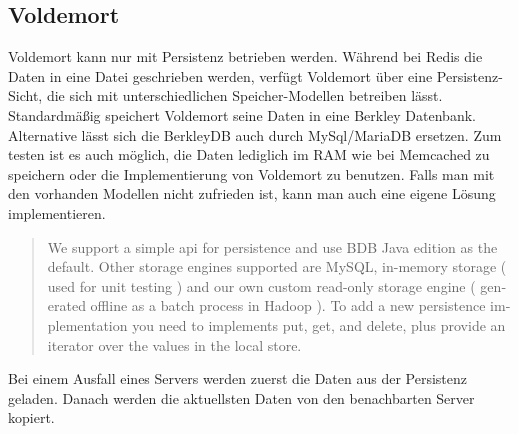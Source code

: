 \subsection{Voldemort}
Voldemort kann nur mit Persistenz betrieben werden. Während bei Redis die Daten
in eine Datei geschrieben werden, verfügt Voldemort über eine Persistenz-Sicht,
die sich mit unterschiedlichen Speicher-Modellen betreiben lässt. Standardmäßig
speichert Voldemort seine Daten in eine Berkley Datenbank. Alternative lässt
sich die BerkleyDB auch durch MySql/MariaDB ersetzen. Zum testen ist es auch
möglich, die Daten lediglich im \gls{RAM} wie bei Memcached zu speichern oder
die Implementierung von Voldemort zu benutzen. Falls man mit den vorhanden
Modellen nicht zufrieden ist, kann man auch eine eigene Lösung implementieren.

\foreignblockquote{english}[\cite{Voldemort2017}]{We support a simple api for
persistence and use BDB Java edition as the default. Other storage engines
supported are MySQL, in-memory storage ( used for unit testing ) and our own
custom read-only storage engine ( generated offline as a batch process in
Hadoop ). To add a new persistence implementation you need to implements put,
get, and delete, plus provide an iterator over the values in the local store.}

Bei einem Ausfall eines Servers werden zuerst die Daten aus der Persistenz
geladen. Danach werden die aktuellsten Daten von den benachbarten Server
kopiert.
